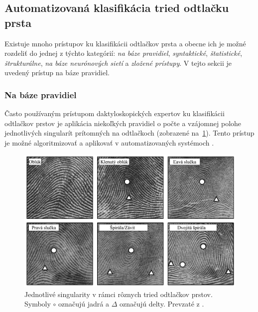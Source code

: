   \subsection{Automatizovaná klasifikácia tried odtlačku prsta} \label{sec:auto_klasif}
  Existuje mnoho prístupov ku klasifikácii odtlačkov prsta a obecne ich je možné rozdeliť do jednej z týchto kategórií: \emph{na báze pravidiel},
  \emph{syntaktické}, \emph{štatistické}, \emph{štrukturálne}, \emph{na báze neurónových sietí} a \emph{zložené prístupy}. V tejto sekcii je uvedený
  prístup na báze pravidiel.

  \subsubsection*{Na báze pravidiel} \label{sec:rule-based}
  Často používaným prístupom daktyloskopických expertov ku klasifikácii odtlačkov prstov je aplikácia niekoľkých pravidiel o počte a vzájomnej polohe
  jednotlivých singularít prítomných na odtlačkoch (zobrazené na~{\ref{obr:singularity_v_triedach}}). Tento prístup je možné algoritmizovať a aplikovať
  v automatizovaných systémoch \cite{Handbook}.

  \begin{figure}[h]
    \centering
    \includegraphics[width=0.85\linewidth]{obrazky-figures/singularity_v_triedach.png}
    \caption{Jednotlivé singularity v rámci rôznych tried odtlačkov prstov. Symboly $\circ{}$ označujú jadrá a $\Delta{}$ označujú delty.
    Prevzaté z \cite{Handbook}.}
    \label{obr:singularity_v_triedach}
  \end{figure}

